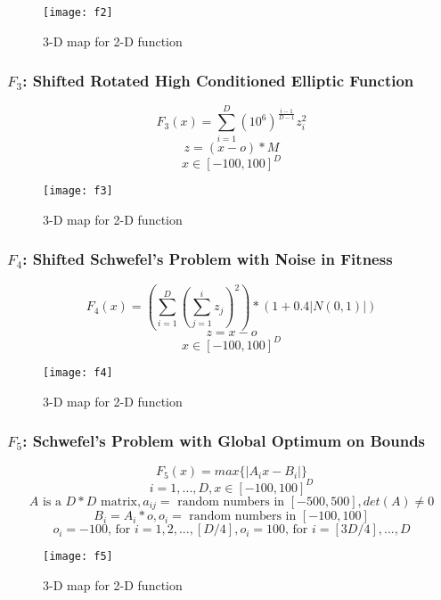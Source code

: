 \begin{figure}[H]
  \centering
  \texttt{[image: f2]}
  \caption{3-D map for 2-D function}
  \label{f2}
\end{figure}

\subsubsection{$F_3$: Shifted Rotated High Conditioned Elliptic Function}

\begin{equation}
  F_3(x)=\sum_{i=1}^{D}{(10^6)^{\frac{i-1}{D-1}}z_i^2}
\end{equation}
\[ z=(x-o)*M \]
\[ x \in [-100,100]^D \]

\begin{figure}[H]
  \centering
  \texttt{[image: f3]}
  \caption{3-D map for 2-D function}
  \label{f3}
\end{figure}

\subsubsection{$F_4$: Shifted Schwefel’s Problem with Noise in Fitness}

\begin{equation}
  F_4(x)=(\sum_{i=1}^{D}{(\sum_{j=1}^{i}{z_j})^2})*(1+0.4|N(0,1)|)
\end{equation}
\[ z=x-o \]
\[ x \in [-100,100]^D \]

\begin{figure}[H]
  \centering
  \texttt{[image: f4]}
  \caption{3-D map for 2-D function}
  \label{f4}
\end{figure}

\subsubsection{$F_5$: Schwefel’s Problem with Global Optimum on Bounds}

\begin{equation}
  F_5(x)=max\{|A_ix-B_i|\}
\end{equation}
\[ i=1,...,D, x \in [-100,100]^D \]
\[ A \text{ is a } D*D \text{ matrix}, a_{ij} = \text{ random numbers in } [-500,500],  det(A) \neq 0 \]
\[ B_i = A_i * o, o_i = \text{ random numbers in } [-100,100] \]
\[ o_i = -100 \text{, for } i=1,2,...,[D/4], o_i = 100 \text{, for } i=[3D/4],...,D \]

\begin{figure}[H]
  \centering
  \texttt{[image: f5]}
  \caption{3-D map for 2-D function}
  \label{f5}
\end{figure}


